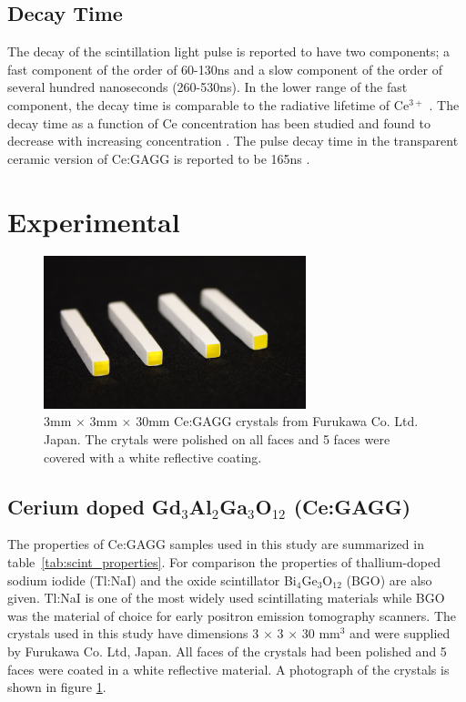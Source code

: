 \documentclass[journal]{IEEEtran}
\begin{document}
\subsection{Decay Time}

The decay of the scintillation light pulse is reported to have two components; a fast component of the order of 60-130ns and a slow component of the order of several hundred nanoseconds (260-530ns). In the lower range of the fast component, the decay time is comparable to the radiative lifetime of Ce$^{3+}$ \cite{kamada:sc_scint}. The decay time as a function of Ce concentration has been studied and found to decrease with increasing concentration \cite{gagg:kamada03}. The pulse decay time in the transparent ceramic version of Ce:GAGG is reported to be 165ns \cite{yan:gagg}. 

\section{Experimental}

\begin{figure}[tb]																			
\centering
\includegraphics[width=3in]{gagg_crystals.jpg}
\caption{3mm $\times$ 3mm $\times$ 30mm Ce:GAGG crystals from Furukawa Co. Ltd. Japan. The crytals were polished on all faces and 5 faces were covered with a white reflective coating.}
\label{fig:GAGG}
\end{figure}

%
%
\subsection{Cerium doped Gd$_{3}$Al$_{2}$Ga$_{3}$O$_{12}$ (Ce:GAGG)}
The properties of Ce:GAGG samples used in this study are summarized in table~\ref{tab:scint_properties}. For comparison the properties of thallium-doped sodium iodide (Tl:NaI) and the oxide scintillator Bi$_{4}$Ge$_{3}$O$_{12}$ (BGO) are also given. Tl:NaI is one of the most widely used scintillating materials while BGO was the material of choice for early positron emission tomography scanners. The crystals used in this study have dimensions 3 $\times$ 3 $\times$ 30 mm$^{3}$ and were supplied by Furukawa Co. Ltd, Japan. All faces of the crystals had been polished and 5 faces were coated in a white reflective material. A photograph of the crystals is shown in figure \ref{fig:GAGG}. 
%
\end{document}
